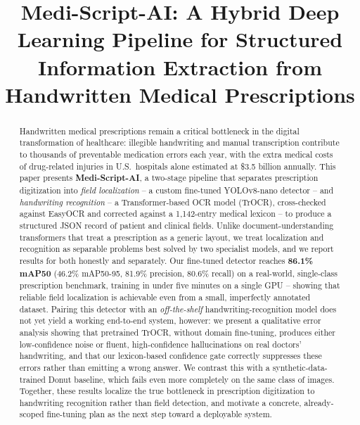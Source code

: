 \documentclass[conference]{IEEEtran}
\begin{document}
\title{Medi-Script-AI: A Hybrid Deep Learning Pipeline for Structured\\
Information Extraction from Handwritten Medical Prescriptions}

\author{
}

\maketitle

\begin{abstract}
Handwritten medical prescriptions remain a critical bottleneck in the digital transformation of healthcare: illegible handwriting and manual transcription contribute to thousands of preventable medication errors each year, with the extra medical costs of drug-related injuries in U.S.\ hospitals alone estimated at \$3.5 billion annually. This paper presents \textbf{Medi-Script-AI}, a two-stage pipeline that separates prescription digitization into \emph{field localization} -- a custom fine-tuned YOLOv8-nano detector -- and \emph{handwriting recognition} -- a Transformer-based OCR model (TrOCR), cross-checked against EasyOCR and corrected against a 1{,}142-entry medical lexicon -- to produce a structured JSON record of patient and clinical fields. Unlike document-understanding transformers that treat a prescription as a generic layout, we treat localization and recognition as separable problems best solved by two specialist models, and we report results for both honestly and separately. Our fine-tuned detector reaches \textbf{86.1\% mAP50} (46.2\% mAP50-95, 81.9\% precision, 80.6\% recall) on a real-world, single-class prescription benchmark, training in under five minutes on a single GPU -- showing that reliable field localization is achievable even from a small, imperfectly annotated dataset. Pairing this detector with an \emph{off-the-shelf} handwriting-recognition model does not yet yield a working end-to-end system, however: we present a qualitative error analysis showing that pretrained TrOCR, without domain fine-tuning, produces either low-confidence noise or fluent, high-confidence hallucinations on real doctors' handwriting, and that our lexicon-based confidence gate correctly suppresses these errors rather than emitting a wrong answer. We contrast this with a synthetic-data-trained Donut baseline, which fails even more completely on the same class of images. Together, these results localize the true bottleneck in prescription digitization to handwriting recognition rather than field detection, and motivate a concrete, already-scoped fine-tuning plan as the next step toward a deployable system.
\end{abstract}
\end{document}
